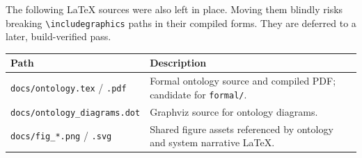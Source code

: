 The following LaTeX sources were also left in place. Moving them blindly
risks breaking \verb|\includegraphics| paths in their compiled forms.
They are deferred to a later, build-verified pass.

\begin{center}
\begin{tabular}{lp{8cm}}
\toprule
Path & Description \\
\midrule
\texttt{docs/ontology.tex} / \texttt{.pdf} & Formal ontology source and compiled PDF; candidate for \texttt{formal/}. \\
\texttt{docs/ontology\_diagrams.dot} & Graphviz source for ontology diagrams. \\
\texttt{docs/fig\_*.png} / \texttt{.svg} & Shared figure assets referenced by ontology and system narrative LaTeX. \\
\bottomrule
\end{tabular}
\end{center}

